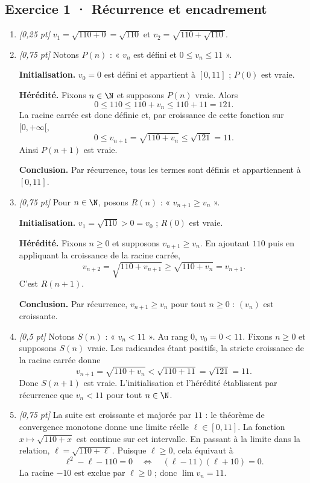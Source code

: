 \subsection*{Exercice 1 · Récurrence et encadrement}\begin{enumerate}

\item \textit{[0,25 pt]} $v_1=\sqrt{110+0}=\sqrt{110}$ et $v_2=\sqrt{110+\sqrt{110}}$.

\item \textit{[0,75 pt]} Notons $P(n)$ : « $v_n$ est défini et $0\le v_n\le 11$ ».
\par\smallskip\textbf{Initialisation.} $v_0=0$ est défini et appartient à $[0,11]$ ; $P(0)$ est vraie.
\par\smallskip\textbf{Hérédité.} Fixons $n\in\N$ et supposons $P(n)$ vraie. Alors
\[0\le 110\le 110+v_n\le 110+11=121.\]
La racine carrée est donc définie et, par croissance de cette fonction sur $[0,+\infty[$,
\[0\le v_{n+1}=\sqrt{110+v_n}\le\sqrt{121}=11.\]
Ainsi $P(n+1)$ est vraie.
\par\smallskip\textbf{Conclusion.} Par récurrence, tous les termes sont définis et appartiennent à $[0,11]$.

\item \textit{[0,75 pt]} Pour $n\in\N$, posons $R(n)$ : « $v_{n+1}\ge v_n$ ».
\par\smallskip\textbf{Initialisation.} $v_1=\sqrt{110}>0=v_0$ ; $R(0)$ est vraie.
\par\smallskip\textbf{Hérédité.} Fixons $n\ge0$ et supposons $v_{n+1}\ge v_n$. En ajoutant $110$ puis en appliquant la croissance de la racine carrée,
\[v_{n+2}=\sqrt{110+v_{n+1}}\ge\sqrt{110+v_n}=v_{n+1}.\]
C'est $R(n+1)$.
\par\smallskip\textbf{Conclusion.} Par récurrence, $v_{n+1}\ge v_n$ pour tout $n\ge0$ : $(v_n)$ est croissante.

\item \textit{[0,5 pt]} Notons $S(n)$ : « $v_n<11$ ». Au rang $0$, $v_0=0<11$.
Fixons $n\ge0$ et supposons $S(n)$ vraie. Les radicandes étant positifs, la stricte croissance de la racine carrée donne
\[v_{n+1}=\sqrt{110+v_n}<\sqrt{110+11}=\sqrt{121}=11.\]
Donc $S(n+1)$ est vraie. L'initialisation et l'hérédité établissent par récurrence que $v_n<11$ pour tout $n\in\N$.

\item \textit{[0,75 pt]} La suite est croissante et majorée par $11$ : le théorème de convergence monotone donne une limite réelle $\ell\in[0,11]$.
La fonction $x\mapsto\sqrt{110+x}$ est continue sur cet intervalle. En passant à la limite dans la relation, $\ell=\sqrt{110+\ell}$. Puisque $\ell\ge0$, cela équivaut à
\[\ell^2-\ell-110=0\quad\Longleftrightarrow\quad(\ell-11)(\ell+10)=0.\]
La racine $-10$ est exclue par $\ell\ge0$ ; donc $\lim v_n=11$.


\end{enumerate}
